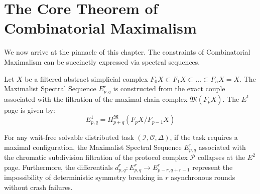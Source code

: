 \section{The Core Theorem of Combinatorial Maximalism}

We now arrive at the pinnacle of this chapter. The constraints of Combinatorial Maximalism can be succinctly expressed via spectral sequences.

\begin{definition}
Let $X$ be a filtered abstract simplicial complex $F_0 X \subset F_1 X \subset \dots \subset F_n X = X$. The Maximalist Spectral Sequence $E_{p,q}^r$ is constructed from the exact couple associated with the filtration of the maximal chain complex $\mathfrak{M}(F_p X)$. The $E^1$ page is given by:
\[
E_{p,q}^1 = H_{p+q}^{\mathfrak{M}}(F_p X / F_{p-1} X)
\]
\end{definition}

\begin{theorem}
\label{thm:core_maximalism}
For any wait-free solvable distributed task $(\mathcal{I}, \mathcal{O}, \Delta)$, if the task requires a maximal configuration, the Maximalist Spectral Sequence $E_{p,q}^r$ associated with the chromatic subdivision filtration of the protocol complex $\mathcal{P}$ collapses at the $E^2$ page.
Furthermore, the differentials $d^r_{p,q}: E^r_{p,q} \to E^r_{p-r, q+r-1}$ represent the impossibility of deterministic symmetry breaking in $r$ asynchronous rounds without crash failures.
\end{theorem}

